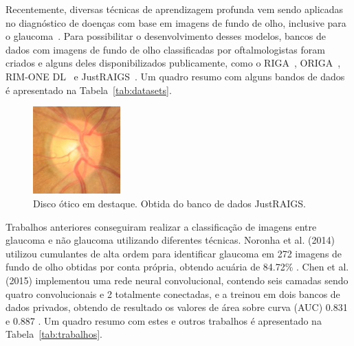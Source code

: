 \documentclass[12pt]{article}
\begin{document}

Recentemente, diversas técnicas de aprendizagem profunda vem sendo aplicadas no diagnóstico de doenças com base em imagens de fundo de olho, inclusive para o glaucoma~\cite{li_review_2021}. Para possibilitar o desenvolvimento desses modelos, bancos de dados com imagens de fundo de olho classificadas por oftalmologistas foram criados e alguns deles disponibilizados publicamente, como o RIGA~\cite{riga}, ORIGA~\cite{origa}, RIM-ONE DL~\cite{RIMONEDL} e JustRAIGS~\cite{justraigs}. Um quadro resumo com alguns bandos de dados é apresentado na Tabela~\ref{tab:datasets}. 

\begin{figure}[htb]
 \centering
 \includegraphics[width=0.3\textwidth]{images/disk.jpg}
 \caption{Disco ótico em destaque. Obtida do banco de dados JustRAIGS.}
 \label{fig:disk}
\end{figure}


Trabalhos anteriores conseguiram realizar a classificação de imagens entre glaucoma e não glaucoma utilizando diferentes técnicas. Noronha et al. (2014) utilizou cumulantes de alta ordem para identificar glaucoma em 272 imagens de fundo de olho obtidas por conta própria, obtendo acuária de 84.72\% \cite{Noronha2014}. Chen et al. (2015) implementou uma rede neural convolucional, contendo seis camadas sendo quatro convolucionais e 2 totalmente conectadas, e a treinou em dois bancos de dados privados, obtendo de resultado os valores de área sobre curva (AUC) 0.831 e 0.887 \cite{chen2015glaucomadetection}. Um quadro resumo com estes e outros trabalhos é apresentado na Tabela~\ref{tab:trabalhos}.
\end{document}
